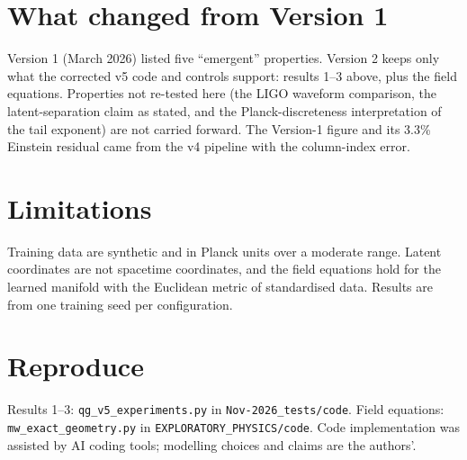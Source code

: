 \documentclass[10pt,twocolumn]{article}
\begin{document}
\section{What changed from Version 1}
Version 1 (March 2026) listed five ``emergent'' properties. Version 2 keeps only what the corrected
v5 code and controls support: results 1--3 above, plus the field equations. Properties not
re-tested here (the LIGO waveform comparison, the latent-separation claim as stated, and the
Planck-discreteness interpretation of the tail exponent) are not carried forward. The Version-1
figure and its 3.3\% Einstein residual came from the v4 pipeline with the column-index error.

\section{Limitations}
Training data are synthetic and in Planck units over a moderate range. Latent coordinates are not
spacetime coordinates, and the field equations hold for the learned manifold with the Euclidean
metric of standardised data. Results are from one training seed per configuration.

\section*{Reproduce}
\small Results 1--3: \texttt{qg\_v5\_experiments.py} in \texttt{Nov-2026\_tests/code}.
Field equations: \texttt{mw\_exact\_geometry.py} in \texttt{EXPLORATORY\_PHYSICS/code}. Code
implementation was assisted by AI coding tools; modelling choices and claims are the authors'.
\end{document}
